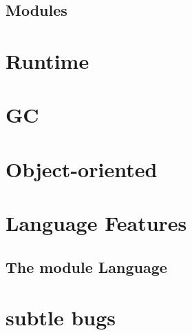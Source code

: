 \documentclass[svgnames,12pt,a4paper]{book}
\begin{document}
  
  
  
  
  
  
  

  
  
  
  
  
  
  
  
  

  
  
\section{Modules}


\chapter{Runtime}
\label{sec:runtime}



\chapter{GC}
\label{sec:gc}



\chapter{Object-oriented}



\chapter{Language Features}
\label{sec:compl-lang-feat}









\section{The module Language}
\label{sec:module-language}

\chapter{subtle bugs}
\label{sec:subtle-bugs}




\end{document}
